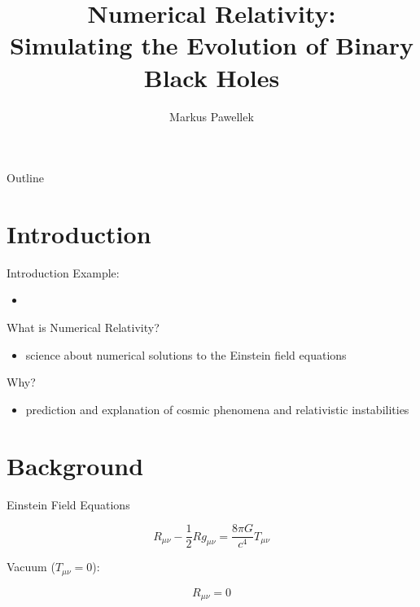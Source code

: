 \documentclass[aspectratio=169]{beamer}
\title{Numerical Relativity: \\ Simulating the Evolution of Binary Black Holes}
\author{Markus Pawellek}
\begin{document}
  \frame{\titlepage}
  \begin{frame}{Outline}
    \footnotesize
    \hfill\parbox[t][7cm][l]{0.9\textwidth}{\tableofcontents}
  \end{frame}

  \section{Introduction} %
  \label{sec:introduction}
    \begin{frame}{Introduction}
      Example:
      \begin{itemize}
        \item{
          \href{run:videos/sxs-bbh-gravitational_lensing_of_gw150914.webm}{}
          \href{https://en.wikipedia.org/wiki/File:BBH_gravitational_lensing_of_gw150914.webm}{}
        }
      \end{itemize}
      \bigskip

      What is Numerical Relativity?
      \begin{itemize}
        \item science about numerical solutions to the Einstein field equations
      \end{itemize}
      \bigskip

      \pause
      Why?
      \begin{itemize}
        \item prediction and explanation of cosmic phenomena and relativistic instabilities
      \end{itemize}
    \end{frame}

  \section{Background} %
  \label{sec:background}
    \begin{frame}{Einstein Field Equations}
      \begin{mybox}
        \[
          R_{μν} - \frac{1}{2}Rg_{μν} = \frac{8\pi G}{c^4}T_{μν}
        \]
      \end{mybox}
      \bigskip

      \pause
      Vacuum ($T_{μν}=0$):
      \begin{mybox}
        \[
          R_{μν} = 0
        \]
      \end{mybox}
    \end{frame}
\end{document}
